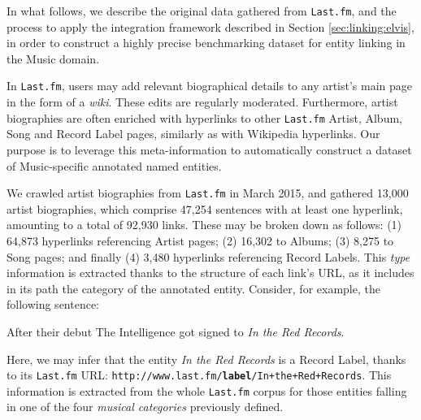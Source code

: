 In what follows, we describe the original data gathered from \texttt{Last.fm}, and the process to apply the integration framework described in Section \ref{sec:linking:elvis}, in order to construct a highly precise benchmarking dataset for entity linking in the Music domain.


In \texttt{Last.fm}, users may add relevant biographical details to any artist's main page in the form of a \textit{wiki}. These edits are regularly moderated. Furthermore, artist biographies are often enriched with hyperlinks to other \texttt{Last.fm} Artist, Album, Song and Record Label pages, similarly as with Wikipedia hyperlinks. Our purpose is to leverage this meta-information to automatically construct a dataset of Music-specific annotated named entities.%

We crawled artist biographies from \texttt{Last.fm} in March 2015, and gathered 13,000 artist biographies, which comprise 47,254 sentences with at least one hyperlink, amounting to a total of 92,930 links. These may be broken down as follows: (1) 64,873 hyperlinks referencing Artist pages; (2) 16,302 to Albums; (3) 8,275 to Song pages; and finally (4) 3,480 hyperlinks referencing Record Labels. This \textit{type} information is extracted thanks to the structure of each link's URL, as it includes in its path the category of the annotated entity. Consider, for example, the following sentence:

\begin{adjustwidth}{2.5em}{20pt}
\begin{center}
After their debut The Intelligence got signed to \textit{In the Red Records}.\\
\end{center}
\end{adjustwidth}


Here, we may infer that the entity \textit{In the Red Records} is a Record Label, thanks to its \texttt{Last.fm} URL: {\footnotesize{\texttt{http://www.last.fm/{\normalsize\textbf{label}}/In+the+Red+Records}}}. This information is extracted from the whole \texttt{Last.fm} corpus for those entities falling in one of the four \textit{musical categories} previously defined.


